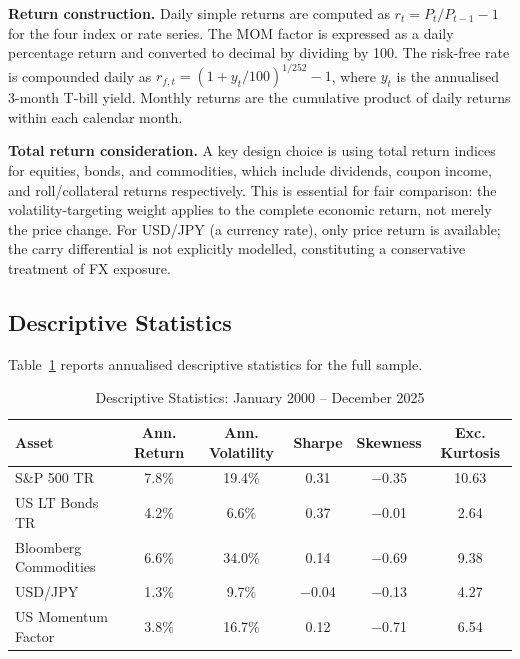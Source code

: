 \documentclass[12pt, a4paper]{article}
\begin{document}
\noindent\textbf{Return construction.} Daily simple returns are computed as $r_t =
P_t/P_{t-1} - 1$ for the four index or rate series. The MOM factor is expressed as a
daily percentage return and converted to decimal by dividing by 100. The risk-free rate
is compounded daily as $r_{f,t} = (1 + y_t/100)^{1/252} - 1$, where $y_t$ is the
annualised 3-month T-bill yield. Monthly returns are the cumulative product of daily
returns within each calendar month.

\noindent\textbf{Total return consideration.} A key design choice is using total return
indices for equities, bonds, and commodities, which include dividends, coupon income, and
roll/collateral returns respectively. This is essential for fair comparison: the
volatility-targeting weight applies to the complete economic return, not merely the price
change. For USD/JPY (a currency rate), only price return is available; the carry
differential is not explicitly modelled, constituting a conservative treatment of FX
exposure.

\subsection{Descriptive Statistics}

Table~\ref{tab:desc_stats} reports annualised descriptive statistics for the full sample.

\begin{table}[H]
  \centering
  \caption{Descriptive Statistics: January 2000 -- December 2025}
  \label{tab:desc_stats}
  \small
  \begin{tabular}{lccccc}
    \toprule
    \textbf{Asset} & \textbf{Ann. Return} & \textbf{Ann. Volatility} & \textbf{Sharpe}
                   & \textbf{Skewness} & \textbf{Exc. Kurtosis} \\
    \midrule
    S\&P 500 TR              & 7.8\%  & 19.4\% &  0.31 & $-$0.35 & 10.63 \\
    US LT Bonds TR           & 4.2\%  &  6.6\% &  0.37 & $-$0.01 &  2.64 \\
    Bloomberg Commodities    & 6.6\%  & 34.0\% &  0.14 & $-$0.69 &  9.38 \\
    USD/JPY                  & 1.3\%  &  9.7\% & $-$0.04 & $-$0.13 & 4.27 \\
    US Momentum Factor       & 3.8\%  & 16.7\% &  0.12 & $-$0.71 &  6.54 \\
    \bottomrule
  \end{tabular}
\end{table}
\end{document}

